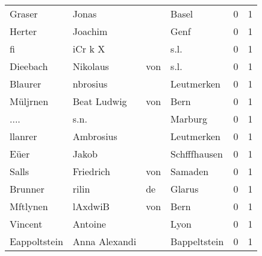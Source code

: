 \documentclass[10pt,a4paper,landscape]{article}
\begin{document}
\begin{longtable}{llllrr}
                   Graser &                              Jonas &             &                                       Basel &          0 &         1 \\
                   Herter &                            Joachim &             &                                        Genf &          0 &         1 \\
                       fi &                            iCr k X &             &                                        s.l. &          0 &         1 \\
                 Dieebach &                           Nikolaus &         von &                                        s.l. &          0 &         1 \\
                  Blaurer &                           nbrosius &             &                                  Leutmerken &          0 &         1 \\
                 Müljrnen &                        Beat Ludwig &         von &                                        Bern &          0 &         1 \\
                     .... &                               s.n. &             &                                     Marburg &          0 &         1 \\
                  llanrer &                          Ambrosius &             &                                  Leutmerken &          0 &         1 \\
                     Eüer &                              Jakob &             &                                Schfffhausen &          0 &         1 \\
                    Salls &                          Friedrich &         von &                                     Samaden &          0 &         1 \\
                  Brunner &                              rilin &          de &                                      Glarus &          0 &         1 \\
                 Mftlynen &                            lAxdwiB &         von &                                        Bern &          0 &         1 \\
                  Vincent &                            Antoine &             &                                        Lyon &          0 &         1 \\
             Eappoltstein &                      Anna Alexandi &             &                                Bappeltstein &          0 &         1 \\

\end{longtable}
\end{document}
